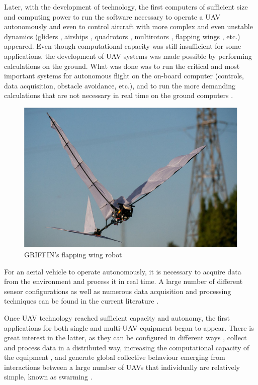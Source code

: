 Later, with the development of technology, the first computers of sufficient size and computing power to run the software necessary to operate a \gls{UAV} autonomously and even to control aircraft with more complex and even unstable dynamics (gliders \cite{predator, BIGBLUE}, airships \cite{AURORA}, quadrotors \cite{quadrotorsreview, mesicopter, pounds, miniquadrotor}, multirotors \cite{fullyactuated}, flapping wings \cite{COLIBRI, GRIFFING, GRIFFIN2021}, etc.) appeared. Even though computational capacity was still insufficient for some applications, the development of \gls{UAV} systems was made possible by performing calculations on the ground. What was done was to run the critical and most important systems for autonomous flight on the on-board computer (controls, data acquisition, obstacle avoidance, etc.), and to run the more demanding calculations that are not necessary in real time on the ground computers \cite{OffBoard}.

\begin{figure}[htbp]
    \centering
    \includegraphics[width=0.6\linewidth]
    {Preliminaries/figures/GRIFFIN.png}
    \caption{GRIFFIN's flapping wing robot \cite{GRIFFIN2021}}
    \label{fig:griffin}
\end{figure}

For an aerial vehicle to operate autonomously, it is necessary to acquire data from the environment and process it in real time. A large number of different sensor configurations as well as numerous data acquisition and processing techniques can be found in the current literature \cite{SenseAndAvoid, aasen2018quantitative, miningSensors}.

Once UAV technology reached sufficient capacity and autonomy, the first applications for both single \cite{nex2014uav, radoglou2020compilation, drummond2015uav} and multi-\gls{UAV} \cite{martinez2007multi, gu2018multiple, scherer2015autonomous} equipment began to appear. There is great interest in the latter, as they can be configured in different ways \cite{multiUAVclassification}, collect and process data in a distributed way, increasing the computational capacity of the equipment \cite{pascarella2015parallel, guo2021coded}, and generate global collective behaviour emerging from interactions between a large number of \glspl{UAV} that individually are relatively simple, known as swarming \cite{zhou2020uav, campion2018uav, chen2020sidr}. 

